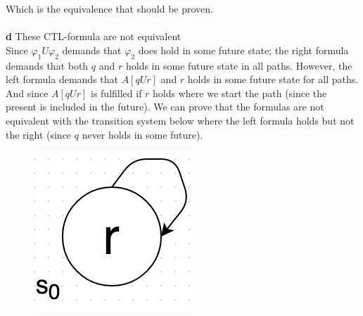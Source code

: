 \documentclass[12pt,oneside,reqno]{amsart}
\begin{document}
Which is the equivalence that should be proven.\\\\
\textbf{d} These CTL-formula are not equivalent\\
Since $\varphi_1 U \varphi_2$ demands that $\varphi_2$ does hold in some future state; the right formula demands that both $q$ and $r$ holds in some future state in all paths. However, the left formula demands that $A[q U r]$ and $r$ holds in some future state for all paths. And since $A[q U r]$ is fulfilled if $r$ holds where we start the path (since the present is included in the future). We can prove that the formulas are not equivalent with the transition system below where the left formula holds but not the right (since $q$ never holds in some future). 
	\begin{figure}[h]
      	\includegraphics[scale=0.7]{prob3d}
	\end{figure}\\\\
\end{document}
